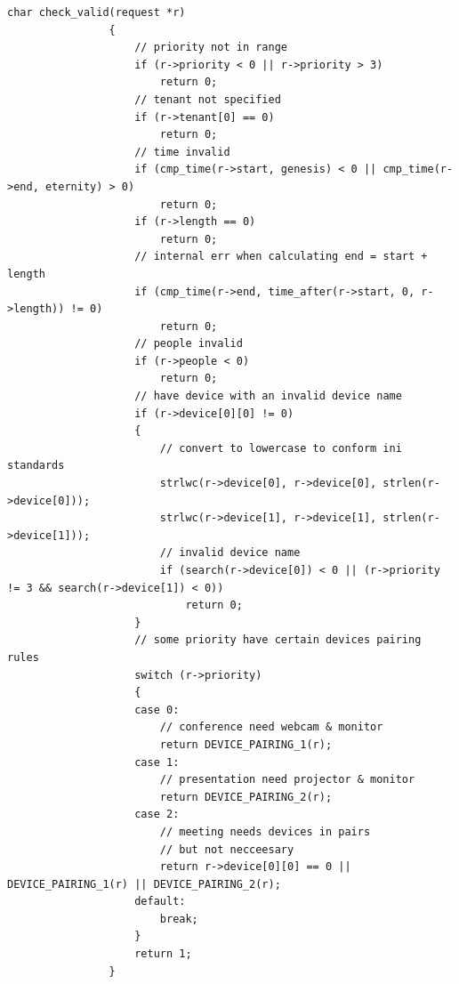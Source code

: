 \documentclass{article}
\begin{document}
\begin{Verbatim}[gobble=8]
                char check_valid(request *r)
                {
                    // priority not in range
                    if (r->priority < 0 || r->priority > 3)
                        return 0;
                    // tenant not specified
                    if (r->tenant[0] == 0)
                        return 0;
                    // time invalid
                    if (cmp_time(r->start, genesis) < 0 || cmp_time(r->end, eternity) > 0)
                        return 0;
                    if (r->length == 0)
                        return 0;
                    // internal err when calculating end = start + length
                    if (cmp_time(r->end, time_after(r->start, 0, r->length)) != 0)
                        return 0;
                    // people invalid
                    if (r->people < 0)
                        return 0;
                    // have device with an invalid device name
                    if (r->device[0][0] != 0)
                    {
                        // convert to lowercase to conform ini standards
                        strlwc(r->device[0], r->device[0], strlen(r->device[0]));
                        strlwc(r->device[1], r->device[1], strlen(r->device[1]));
                        // invalid device name
                        if (search(r->device[0]) < 0 || (r->priority != 3 && search(r->device[1]) < 0))
                            return 0;
                    }
                    // some priority have certain devices pairing rules
                    switch (r->priority)
                    {
                    case 0:
                        // conference need webcam & monitor
                        return DEVICE_PAIRING_1(r);
                    case 1:
                        // presentation need projector & monitor
                        return DEVICE_PAIRING_2(r);
                    case 2:
                        // meeting needs devices in pairs
                        // but not necceesary
                        return r->device[0][0] == 0 || DEVICE_PAIRING_1(r) || DEVICE_PAIRING_2(r);
                    default:
                        break;
                    }
                    return 1;
                }
            \end{Verbatim}
\end{document}
